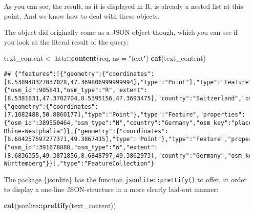 \documentclass[]{book}
\newenvironment{Shaded}{\begin{snugshade}}{\end{snugshade}}
\newcommand{\DataTypeTok}[1]{\textcolor[rgb]{0.13,0.29,0.53}{#1}}
\newcommand{\KeywordTok}[1]{\textcolor[rgb]{0.13,0.29,0.53}{\textbf{#1}}}
\newcommand{\NormalTok}[1]{#1}
\newcommand{\OperatorTok}[1]{\textcolor[rgb]{0.81,0.36,0.00}{\textbf{#1}}}
\newcommand{\StringTok}[1]{\textcolor[rgb]{0.31,0.60,0.02}{#1}}
\begin{document}
As you can see, the result, as it is displayed in R, is already a nested list at this point.
And we know how to deal with these objects.

The object did originally come as a JSON object though, which you can see if you look at the literal result of the query:

\begin{Shaded}
\begin{Highlighting}[]
\NormalTok{text_content <-}\StringTok{ }\NormalTok{httr}\OperatorTok{::}\KeywordTok{content}\NormalTok{(req, }\DataTypeTok{as =} \StringTok{"text"}\NormalTok{)}
\KeywordTok{cat}\NormalTok{(text_content)}
\end{Highlighting}
\end{Shaded}

\begin{verbatim}
## {"features":[{"geometry":{"coordinates":[8.538948327037028,47.369806999999994],"type":"Point"},"type":"Feature","properties":{"osm_id":905841,"osm_type":"R","extent":[8.5381631,47.3702704,8.5395156,47.3693475],"country":"Switzerland","osm_key":"highway","city":"Zurich","osm_value":"pedestrian","postcode":"8001","name":"Paradeplatz","state":"Zurich"}},{"geometry":{"coordinates":[7.1082488,50.8860177],"type":"Point"},"type":"Feature","properties":{"osm_id":389550464,"osm_type":"N","country":"Germany","osm_key":"place","city":"Cologne","osm_value":"locality","postcode":"51147","name":"Paradeplatz","state":"North Rhine-Westphalia"}},{"geometry":{"coordinates":[8.684257597277371,49.3867415],"type":"Point"},"type":"Feature","properties":{"osm_id":391678888,"osm_type":"W","extent":[8.6836355,49.3871856,8.6848797,49.3862973],"country":"Germany","osm_key":"place","city":"Heidelberg","osm_value":"locality","postcode":"69120","name":"Paradeplatz","state":"Baden-Württemberg"}}],"type":"FeatureCollection"}
\end{verbatim}

The package \{jsonlite\} has the function \texttt{jsonlite::prettify()} to offer, in order to display a one-line JSON-structure in a more clearly laid-out manner:

\begin{Shaded}
\begin{Highlighting}[]
\KeywordTok{cat}\NormalTok{(jsonlite}\OperatorTok{::}\KeywordTok{prettify}\NormalTok{(text_content))}
\end{Highlighting}
\end{Shaded}
\end{document}
